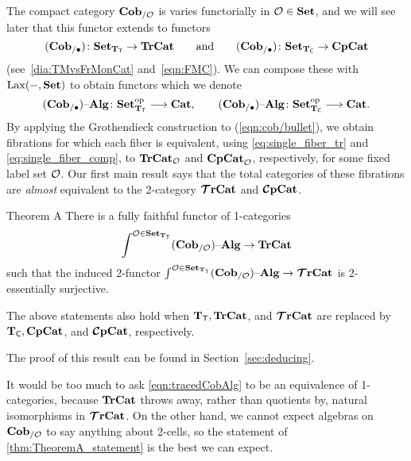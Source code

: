 \documentclass[11pt,oneside,article]{memoir}
\begin{document}
The compact category $\mathbf{Cob}_{/\mathcal{O}}$ is varies functorially in $\mathcal{O}\in\mathbf{Set}$, and we will see later that
this functor extends to functors
\begin{equation*}
   (\mathbf{Cob}_{/\bullet})\colon\mathbf{Set}_{\mathbf{T}_{\mathsf{T}}}\to\mathbf{TrCat}\qquad\textnormal{and}
   \qquad
   (\mathbf{Cob}_{/\bullet})\colon\mathbf{Set}_{\mathbf{T}_{\mathsf{C}}}\to\mathbf{CpCat}
\end{equation*}
(see~\eqref{dia:TMvsFrMonCat} and~\eqref{eqn:FMC}). We can compose these with $\operatorname{Lax}(-,\mathbf{Set})$ to
obtain functors which we denote
\begin{equation}\label{eqn:cob/bullet}
   (\mathbf{Cob}_{/\bullet}){\text \textendash}\mathbf{Alg}\colon\mathbf{Set}_{\mathbf{T}_{\mathsf{T}}}^{\mathrm{op}}\longrightarrow\mathbf{Cat},
   \qquad
   (\mathbf{Cob}_{/\bullet}){\text \textendash}\mathbf{Alg}\colon\mathbf{Set}_{\mathbf{T}_{\mathsf{C}}}^{\mathrm{op}}\longrightarrow\mathbf{Cat}.
\end{equation}
By applying the Grothendieck construction to (\ref{eqn:cob/bullet}), we obtain fibrations for which each fiber is equivalent, using \eqref{eq:single_fiber_tr} and \eqref{eq:single_fiber_comp},
to $\mathbf{TrCat}_{\mathcal{O}}$ and $\mathbf{CpCat}_{\mathcal{O}}$, respectively, for some fixed label set $\mathcal{O}$. Our
first main result says that the total categories of these fibrations are \emph{almost} equivalent to
the 2-category $\bm{\mathcal{T}}\mathbf{rCat}$ and $\bm{\mathcal{C}}\mathbf{pCat}$.

\begin{named}{Theorem A}\label{thm:TheoremA_statement}
  There is a fully faithful functor of 1-categories
  \begin{equation}\label{eqn:tracedCobAlg}
     \int^{\mathcal{O}\in\mathbf{Set}_{\mathbf{T}_{\mathsf{T}}}}(\mathbf{Cob}_{/\mathcal{O}}){\text \textendash}\mathbf{Alg} \to \mathbf{TrCat}
  \end{equation}
  such that the induced 2-functor $\int^{\mathcal{O}\in\mathbf{Set}_{\mathbf{T}_{\mathsf{T}}}}(\mathbf{Cob}_{/\mathcal{O}}){\text \textendash}\mathbf{Alg}\to\bm{\mathcal{T}}\mathbf{rCat}$ is 2-essentially surjective. 

  The above statements also hold when $\mathbf{T}_{\mathsf{T}}, \mathbf{TrCat}$, and $\bm{\mathcal{T}}\mathbf{rCat}$ are replaced by $\mathbf{T}_{\mathsf{C}}, \mathbf{CpCat}$, and $\bm{\mathcal{C}}\mathbf{pCat}$, respectively.
\end{named}

The proof of this result can be found in Section~\ref{sec:deducing}.

\begin{remark}
   It would be too much to ask \eqref{eqn:tracedCobAlg} to be an equivalence of 1-categories, because $\mathbf{TrCat}$ throws away, rather than quotients by, natural isomorphisms in $\bm{\mathcal{T}}\mathbf{rCat}$. On the other hand, we cannot expect algebras on $\mathbf{Cob}_{/\mathcal{O}}$ to say anything about 2-cells, so the statement of \ref{thm:TheoremA_statement} is the best we can expect.
\end{remark}
\end{document}
